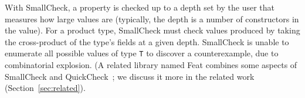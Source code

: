 \documentclass[10pt]{sigplanconf}
\newcommand{\ttp}[1]{\texttt{#1}}
\begin{document}

With SmallCheck, a property is checked up to a depth set by the user that
measures how large values are (typically, the depth is a number of constructors
in the value).  For a product type, SmallCheck must check values produced by
taking the cross-product of the type's fields at a given depth.  SmallCheck is
unable to enumerate all possible values of type \ttp{T} to discover a
counterexample, due to combinatorial explosion.  (A related library named Feat
combines some aspects of SmallCheck and QuickCheck~\cite{feat}; we discuss it
more in the related work (Section~\ref{sec:related}).




\end{document}

